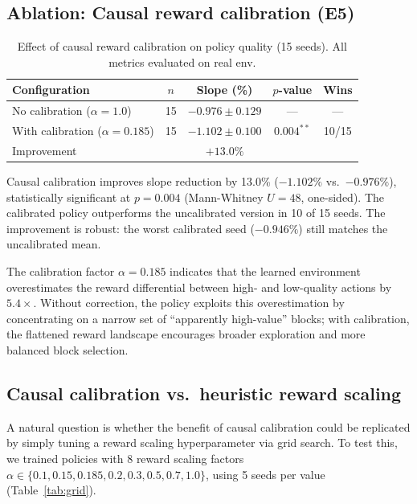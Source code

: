 \documentclass[11pt]{article}
\begin{document}
\subsection{Ablation: Causal reward calibration (E5)}

\begin{table}[htbp]
\centering
\caption{Effect of causal reward calibration on policy quality (15 seeds). All metrics evaluated on real env.}
\label{tab:e5}
\begin{tabular}{lcccc}
\toprule
Configuration & $n$ & Slope (\%) & $p$-value & Wins \\
\midrule
No calibration ($\alpha = 1.0$)       & 15 & $-0.976 \pm 0.129$ & --- & --- \\
With calibration ($\alpha = 0.185$)   & 15 & $\mathbf{-1.102 \pm 0.100}$ & $0.004^{**}$ & 10/15 \\
\midrule
Improvement & & $+13.0\%$ & & \\
\bottomrule
\end{tabular}
\end{table}

Causal calibration improves slope reduction by 13.0\% ($-1.102\%$ vs.\ $-0.976\%$), statistically significant at $p = 0.004$ (Mann-Whitney $U = 48$, one-sided). The calibrated policy outperforms the uncalibrated version in 10 of 15 seeds. The improvement is robust: the worst calibrated seed ($-0.946\%$) still matches the uncalibrated mean.

The calibration factor $\alpha = 0.185$ indicates that the learned environment overestimates the reward differential between high- and low-quality actions by $5.4\times$. Without correction, the policy exploits this overestimation by concentrating on a narrow set of ``apparently high-value'' blocks; with calibration, the flattened reward landscape encourages broader exploration and more balanced block selection.

\subsection{Causal calibration vs.\ heuristic reward scaling}
\label{sec:grid_search}

A natural question is whether the benefit of causal calibration could be replicated by simply tuning a reward scaling hyperparameter via grid search. To test this, we trained policies with 8 reward scaling factors $\alpha \in \{0.1, 0.15, 0.185, 0.2, 0.3, 0.5, 0.7, 1.0\}$, using 5 seeds per value (Table~\ref{tab:grid}).
\end{document}
